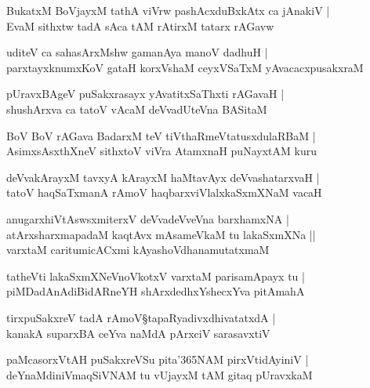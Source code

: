 \begin{shloka}
BukatxM BoVjayxM tathA viVrw pashAcxduBxkAtx ca jAnakiV |\\
EvaM sithxtw tadA sAca tAM rAtirxM tatarx rAGavw
\end{shloka}

\begin{shloka}
uditeV ca sahasArxMshw gamanAya manoV dadhuH |\\
parxtayxknumxKoV gataH korxVshaM ceyxVSaTxM yAvacacxpusakxraM 
\end{shloka}

\begin{shloka}
pUravxBAgeV puSakxrasayx yAvatitxSaThxti rAGavaH |\\
shushArxva ca tatoV vAcaM deVvadUteVna BASitaM 
\end{shloka}

\begin{shloka}
BoV BoV rAGava BadarxM teV tiVthaRmeVtatusxdulaRBaM |\\
AsimxsAsxthXneV sithxtoV viVra AtamxnaH puNayxtAM kuru
\end{shloka}

\begin{shloka}
deVvakArayxM tavxyA kArayxM haMtavAyx deVvashatarxvaH |\\
tatoV haqSaTxmanA rAmoV haqbarxviVlalxkaSxmXNaM vacaH 
\end{shloka}

\begin{shloka}
anugarxhiVtAswsxmiterxV deVvadeVveVna barxhamxNA |\\
atArxsharxmapadaM kaqtAvx mAsameVkaM tu lakaSxmXNa ||\\
varxtaM caritumicACxmi kAyashoVdhanamutatxmaM 
\end{shloka}

\begin{shloka}
tatheVti lakaSxmXNeVnoVkotxV varxtaM parisamApayx tu |\\
piMDadAnAdiBidARneYH shArxdedhxYshecxYva pitAmahA\R
\end{shloka}

\begin{shloka}
tirxpuSakxreV tadA rAmoV\S tapaRyadivxdhivatatxdA |\\
kanakA suparxBA ceYva naMdA pArxciV sarasavxtiV 
\end{shloka}

\begin{shloka}
paMcasorxVtAH puSakxreVSu pita\char'365NAM pirxVtidAyiniV |\\
deYnaMdiniVmaqSiVNAM tu vUjayxM tAM gitaq pUravxkaM 
\end{shloka}


